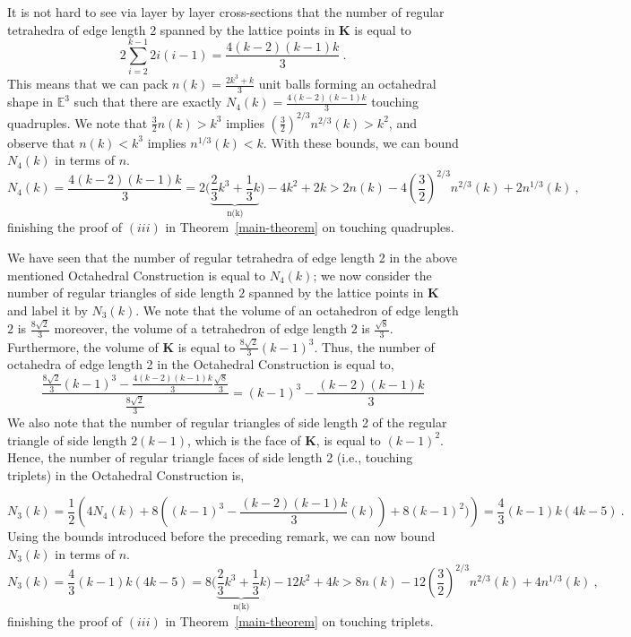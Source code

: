 \documentclass[10pt]{article}
\newtheorem{Remark}{Remark}
\numberwithin{Subcase}{Case}
\begin{document}
It is not hard to see via layer by layer cross-sections that the number of regular tetrahedra of edge length 2 spanned by the lattice points in $\mathbf{K}$ is equal to  $$2\sum\limits_{i=2}^{k-1} 2i(i-1) = \frac{4(k-2)(k-1)k}{3}\ .$$  
This means that we can pack $n(k)=\frac{2k^{3}+k}{3}$ unit balls forming an octahedral shape in $\mathbb{E}^3$ such that there are exactly $N_{4}(k)=\frac{4(k-2)(k-1)k}{3}$ touching quadruples. We note that $\frac{3}{2}n(k) > k^{3}$ implies $\left(\frac{3}{2}\right)^{2/3}n^{2/3}(k) > k^2$, and observe that $n(k) < k^{3}$ implies $n^{1/3}(k) < k$. With these bounds, we can bound $N_{4}(k)$ in terms of $n$.
$$N_{4}(k)=\frac{4(k-2)(k-1)k}{3}=2\Big(\underbrace{\frac{2}{3}k^{3}+\frac{1}{3}k}_{\text{n(k)}}\Big) - 4k^{2} + 2k > 2n(k) - 4\left(\frac{3}{2}\right)^{2/3}n^{2/3}(k) + 2n^{1/3}(k)\ ,$$
finishing the proof of $(iii)$ in Theorem~\ref{main-theorem} on touching quadruples.


We have seen that the number of regular tetrahedra of edge length 2 in the above mentioned Octahedral Construction is equal to $N_{4}(k)$; we now consider the number of regular triangles of side length $2$ spanned by the lattice points in $\mathbf{K}$ and label it by $N_{3}(k)$. We note that the volume of an octahedron of edge length $2$ is $\frac{8\sqrt{2}}{3}$ moreover, the volume of a tetrahedron of edge length $2$ is $\frac{\sqrt{8}}{3}$. Furthermore, the volume of $\mathbf{K}$ is equal to $\frac{8\sqrt{2}}{3}(k-1)^{3}$. Thus, the number of octahedra of edge length 2 in the Octahedral Construction is equal to,
$$
\frac{\frac{8\sqrt{2}}{3}(k-1)^{3}-\frac{4(k-2)(k-1)k}{3}\frac{\sqrt{8}}{3}}{\frac{8\sqrt{2}}{3}}=(k-1)^{3}-\frac{(k-2)(k-1)k}{3}
$$
We also note that the number of regular triangles of side length 2 of the regular triangle of side length $2(k-1)$, which is the face of $\mathbf{K}$, is equal to $(k-1)^{2}$. Hence, the number of regular triangle faces of side length 2 (i.e., touching triplets) in the Octahedral Construction is,

$$N_{3}(k) = \frac{1}{2} \left(4N_{4}(k) + 8((k-1)^{3}-\frac{(k-2)(k-1)k}{3}(k))+8(k-1)^{2})\right)= \frac{4}{3}(k-1)k(4k-5)\ .$$
Using the bounds introduced before the preceding remark, we can now bound $N_{3}(k)$ in terms of $n$.
$$N_{3}(k) = \frac{4}{3}(k-1)k(4k-5) = 8\Big(\underbrace{\frac{2}{3}k^{3}+\frac{1}{3}k}_{\text{n(k)}}\Big) -12k^{2} + 4k > 8n(k) - 12\left(\frac{3}{2}\right)^{2/3}n^{2/3}(k)+4n^{1/3}(k)\ ,$$
finishing the proof of $(iii)$ in Theorem~\ref{main-theorem} on touching triplets.
\end{document}
